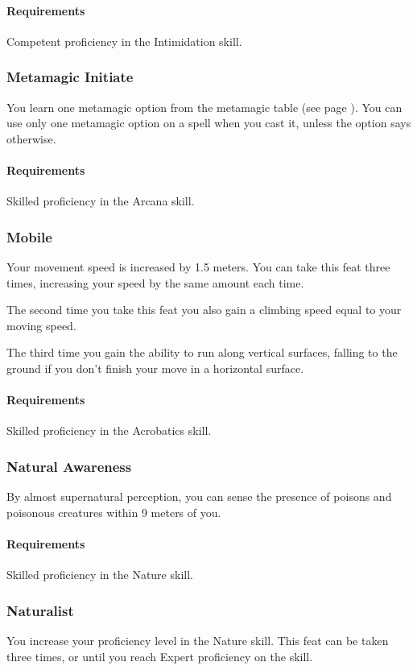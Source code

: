     \paragraph{Requirements} Competent proficiency in the Intimidation skill.
\subsubsection{Metamagic Initiate} \label{feat::metamagicinitiate}
    You learn one metamagic option from the metamagic table (see page \pageref{ssec::metamagic}).
    You can use only one metamagic option on a spell when you cast it, unless the option says otherwise.
    \paragraph{Requirements} Skilled proficiency in the Arcana skill.
\subsubsection{Mobile} \label{feat::mobile}
    Your movement speed is increased by 1.5 meters.
    You can take this feat three times, increasing your speed by the same amount each time.

    The second time you take this feat you also gain a climbing speed equal to your moving speed.

    The third time you gain the ability to run along vertical surfaces, falling to the ground if you don't finish your move in a horizontal surface.
    \paragraph{Requirements} Skilled proficiency in the Acrobatics skill.
\subsubsection{Natural Awareness} \label{feat::naturalawareness}
    By almost supernatural perception, you can sense the presence of poisons and poisonous creatures within 9 meters of you.

    \paragraph{Requirements} Skilled proficiency in the Nature skill.
\subsubsection{Naturalist} \label{feat::naturalist}
    You increase your proficiency level in the Nature skill.
    This feat can be taken three times, or until you reach Expert proficiency on the skill.
